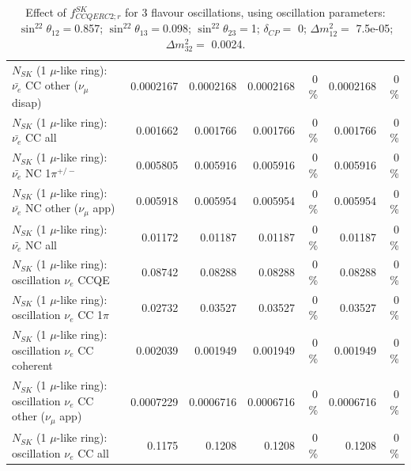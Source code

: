 \begin{table}
\begin{tabular}{| l | r | r | r  r | r  r |}
          $N_{SK}$ (1 $\mu$-like ring): $\bar{\nu_e}$ CC other ($\nu_\mu$ disap) &       0.0002167 &       0.0002168 &       0.0002168 &        0 \%  &       0.0002168 &        0 \%  \\ 
                            $N_{SK}$ (1 $\mu$-like ring): $\bar{\nu_{e}}$ CC all &        0.001662 &        0.001766 &        0.001766 &        0 \%  &        0.001766 &        0 \%  \\ 
\hline
                     $N_{SK}$ (1 $\mu$-like ring): $\bar{\nu_e}$ NC 1$\pi^{+/-}$ &        0.005805 &        0.005916 &        0.005916 &        0 \%  &        0.005916 &        0 \%  \\ 
            $N_{SK}$ (1 $\mu$-like ring): $\bar{\nu_e}$ NC other ($\nu_\mu$ app) &        0.005918 &        0.005954 &        0.005954 &        0 \%  &        0.005954 &        0 \%  \\ 
                            $N_{SK}$ (1 $\mu$-like ring): $\bar{\nu_{e}}$ NC all &         0.01172 &         0.01187 &         0.01187 &        0 \%  &         0.01187 &        0 \%  \\ 
\hline
\hline
\hline
                          $N_{SK}$ (1 $\mu$-like ring): oscillation $\nu_e$ CCQE &         0.08742 &         0.08288 &         0.08288 &        0 \%  &         0.08288 &        0 \%  \\ 
                     $N_{SK}$ (1 $\mu$-like ring): oscillation $\nu_e$ CC 1$\pi$ &         0.02732 &         0.03527 &         0.03527 &        0 \%  &         0.03527 &        0 \%  \\ 
                   $N_{SK}$ (1 $\mu$-like ring): oscillation $\nu_e$ CC coherent &        0.002039 &        0.001949 &        0.001949 &        0 \%  &        0.001949 &        0 \%  \\ 
      $N_{SK}$ (1 $\mu$-like ring): oscillation $\nu_e$ CC other ($\nu_\mu$ app) &       0.0007229 &       0.0006716 &       0.0006716 &        0 \%  &       0.0006716 &        0 \%  \\ 
                       $N_{SK}$ (1 $\mu$-like ring): oscillation $\nu_e$  CC all &          0.1175 &          0.1208 &          0.1208 &        0 \%  &          0.1208 &        0 \%  \\ 
\hline
\hline
\end{tabular}
\caption{ Effect of $f_{CCQERC2; r}^{SK}$ for 3 flavour oscillations, using oscillation parameters:  $\sin^22\theta_{12} = $0.857; $\sin^22\theta_{13} = $0.098; $\sin^22\theta_{23} = $1; $\delta_{CP} = $        0; $\Delta m^2_{12} = $    7.5e-05; $\Delta m^2_{32} = $    0.0024. }
\label{tab:num_sk_1Rmu_ccqe_ring_counting_eff_2_1RmuT_3f_osc_t13:0.098_spectralreco_spectraltrue}
\end{table}
